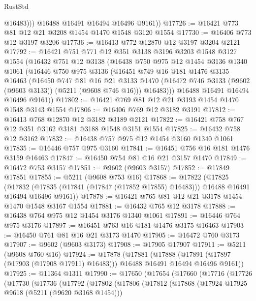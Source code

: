 \begin{lexlean}{RustStd}
\begin{coremodule}
              @16483)))
        @16488
        @16491
        @16494
        @16496
        @9161))
@17726 := @16421 @773 @81 @12 @21 @3208 @1454 @1470 @1548 @3120 @1554
@17730 := @16406 @773 @12 @3197 @3206
@17736 := @16413 @772 @12870 @12 @3197 @3204 @2121
@17792 := @16421
    @751
    @771
    @12
    @351
    @3138
    @3196
    @3203
    @1548
    @3127
    @1554
    (@16432
      @751
      @12
      @3138
      (@16438
        @750
        @975
        @12
        @1454
        @3136
        @1340
        @1061
        (@16446
          @750
          @975
          @3136
          (@16451
            @749
            @16
            @181
            @1476
            @3135
            @16463
            (@16450
              @747
              @81
              @16
              @21
              @3133
              @1470
              (@16472 @746 @3133 (@9602 (@9603 @3133)) (@5211 (@9608 @746 @16)))
              @16483)))
        @16488
        @16491
        @16494
        @16496
        @9161))
@17802 := @16421 @769 @81 @12 @21 @3193 @1454 @1470 @1548 @3143 @1554
@17806 := @16406 @769 @12 @3182 @3191
@17812 := @16413 @768 @12870 @12 @3182 @3189 @2121
@17822 := @16421 @758 @767 @12 @351 @3162 @3181 @3188 @1548 @3151 @1554
@17825 := @16432 @758 @12 @3162
@17832 := @16438 @757 @975 @12 @1454 @3160 @1340 @1061
@17835 := @16446 @757 @975 @3160
@17841 := @16451 @756 @16 @181 @1476 @3159 @16463
@17847 := @16450 @754 @81 @16 @21 @3157 @1470
@17849 := @16472 @753 @3157
@17851 := @9602 (@9603 @3157)
@17852 := @17849 @17851
@17855 := @5211 (@9608 @753 @16)
@17868 := @17822
    (@17825
      (@17832 (@17835 (@17841 (@17847 (@17852 @17855) @16483))) @16488 @16491 @16494 @16496 @9161))
@17878 := @16421 @765 @81 @12 @21 @3178 @1454 @1470 @1548 @3167 @1554
@17881 := @16432 @765 @12 @3178
@17888 := @16438 @764 @975 @12 @1454 @3176 @1340 @1061
@17891 := @16446 @764 @975 @3176
@17897 := @16451 @763 @16 @181 @1476 @3175 @16463
@17903 := @16450 @761 @81 @16 @21 @3173 @1470
@17905 := @16472 @760 @3173
@17907 := @9602 (@9603 @3173)
@17908 := @17905 @17907
@17911 := @5211 (@9608 @760 @16)
@17924 := @17878
    (@17881
      (@17888 (@17891 (@17897 (@17903 (@17908 @17911) @16483))) @16488 @16491 @16494 @16496 @9161))
@17925 := @11364 @1311
@17990 := @17650
    (@17654
      (@17660
        (@17716
          (@17726
            (@17730
              (@17736
                (@17792
                  (@17802
                    (@17806
                      (@17812
                        (@17868
                          (@17924 @17925 @9618 (@5211 (@9620 @3168 @1454)))

\end{coremodule}
\end{lexlean}
